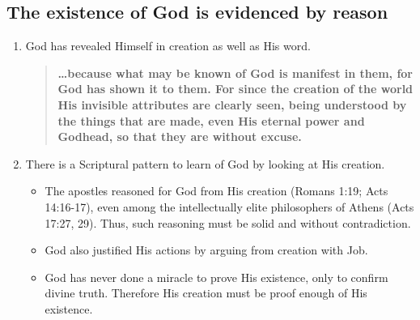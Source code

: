 \documentclass{article}
\newcommand{\BE}{\begin{enumerate}\item}
\newcommand{\EE}{\end{enumerate}}
\newcommand{\BI}{\begin{itemize}\item}
\newcommand{\EI}{\end{itemize}}
\newcommand{\I}{\item}
\newcommand{\Q}[2]{\begin{quote} \textbf{#2 \center{#1}}\end{quote}}
\begin{document}
\subsection{The existence of God is evidenced by reason}
\BE God has revealed Himself in creation as well as His word.
    \Q{Romans 1:19-20}
    {\ldots because what may be known of God is manifest in them, 
    for God has shown it to them. 
    For since the creation of the world His invisible attributes are
    clearly seen, being understood by the things that are made, 
    even His eternal power and Godhead, 
    so that they are without excuse.}
\I  There is a Scriptural pattern to learn of God by looking at
    His creation.
    \BI The apostles reasoned for God from His creation
        (Romans 1:19; Acts 14:16-17),
        even among the intellectually elite
        philosophers of Athens (Acts 17:27, 29).  
        Thus, such reasoning must be solid and without contradiction.
    \I  God also justified His actions by arguing from creation
        with Job.
    \I  God has never done a miracle to prove His existence,
        only to confirm divine truth.
        Therefore His creation must be proof enough of 
        His existence. \EI 
\EE

\end{document}
